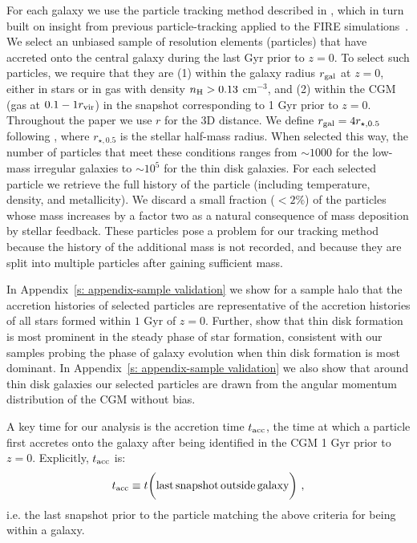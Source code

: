 \documentclass[fleqn,usenatbib]{mnras}
\newcommand{\tacc}{t_{\rm acc}}
\newcommand{\Rvir}{r_{\rm vir}}
\begin{document}
For each galaxy we use the particle tracking method described in \cite{Hafen2019, Hafen2020}, which in turn built on insight from previous particle-tracking applied to the FIRE simulations~\citep{Angles-Alcazar2017}.
We select an unbiased sample of resolution elements (particles) that have accreted onto the central galaxy during the last Gyr prior to $z=0$.
To select such particles, we require that they are
(1) within the galaxy radius $r_{\rm gal}$ at $z=0$, either in stars or in gas with density  $n_{\rm H} > 0.13$ cm$^{-3}$, and
(2) within the CGM (gas at $0.1 - 1 \Rvir$) in the snapshot corresponding to 1 Gyr prior to $z=0$.
Throughout the paper we use $r$ for the 3D distance. 
We define $r_{\rm gal} = 4 r_{\star,0.5}$ following \cite{Hafen2019, Hafen2020}, where $r_{\star, 0.5}$ is the stellar half-mass radius.
When selected this way, the number of particles that meet these conditions ranges from $\sim 1000$ for the low-mass irregular galaxies to $\sim 10^5$ for the thin disk galaxies.
For each selected particle we retrieve the full history of the particle (including temperature, density, and metallicity). 
We discard a small fraction ($<2\%$) of the particles whose mass increases by a factor two as a natural consequence of mass deposition by stellar feedback.
These particles pose a problem for our tracking method because the history of the additional mass is not recorded, and because they are split into multiple particles after gaining sufficient mass.

In Appendix~\ref{s: appendix-sample validation} we show for a sample halo that the accretion histories of selected particles are representative of the accretion histories of all stars formed within $1$ Gyr of $z=0$.
Further, \cite{Yu2021} show that thin disk formation is most prominent in the steady phase of star formation, consistent with our samples probing the phase of galaxy evolution when thin disk formation is most dominant.
In Appendix~\ref{s: appendix-sample validation} we also show that around thin disk galaxies our selected particles are drawn from the angular momentum distribution of the CGM without bias.

A key time for our analysis is the accretion time $\tacc$, the time at which a particle first accretes onto the galaxy after being identified in the CGM 1 Gyr prior to $z=0$.
Explicitly, $\tacc$ is:
\begin{equation}
    \tacc \equiv t \bigg( {\rm last\,snapshot\,outside\,galaxy} \bigg) ~,
\label{e: tacc}
\end{equation}
i.e. the last snapshot prior to the particle matching the above criteria for being within a galaxy.
\end{document}
